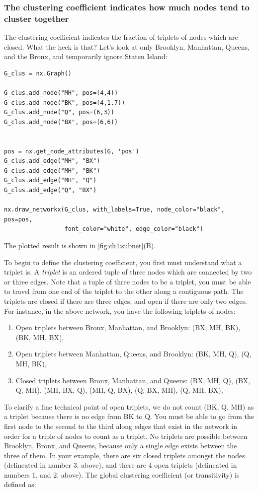 \subsubsection{The clustering coefficient indicates how much nodes tend to cluster together}
\label{sec:ch4:prop-net:clustering}

The clustering coefficient indicates the fraction of triplets of nodes which are closed. What the heck is that? Let's look at only Brooklyn, Manhattan, Queens, and the Bronx, and temporarily ignore Staten Island:

\begin{lstlisting}[style=python]
G_clus = nx.Graph()

G_clus.add_node("MH", pos=(4,4))
G_clus.add_node("BK", pos=(4,1.7))
G_clus.add_node("Q", pos=(6,3))
G_clus.add_node("BX", pos=(6,6))


pos = nx.get_node_attributes(G, 'pos')
G_clus.add_edge("MH", "BX")
G_clus.add_edge("MH", "BK")
G_clus.add_edge("MH", "Q")
G_clus.add_edge("Q", "BX")

nx.draw_networkx(G_clus, with_labels=True, node_color="black", pos=pos,
                 font_color="white", edge_color="black")
\end{lstlisting}
The plotted result is shown in \ref{fig:ch4:subnet}(B).

To begin to define the clustering coefficient, you first must understand what a {triplet} is. A \textit{triplet} is an ordered tuple of three nodes which are connected by two or three edges. Note that a tuple of three nodes to be a triplet, you must be able to travel from one end of the triplet to the other along a contiguous path. The triplets are {closed} if there are three edges, and {open} if there are only two edges. For instance, in the above network, you have the following triplets of nodes:
\begin{enumerate}
    \item Open triplets between Bronx, Manhattan, and Brooklyn: (BX, MH, BK), (BK, MH, BX),
    \item Open triplets between Manhattan, Queens, and Brooklyn: (BK, MH, Q), (Q, MH, BK),
    \item Closed triplets between Bronx, Manhattan, and Queens: (BX, MH, Q), (BX, Q, MH), (MH, BX, Q), (MH, Q, BX), (Q, BX, MH), (Q, MH, BX),
\end{enumerate}

To clarify a fine technical point of open triplets, we do not count (BK, Q, MH) as a triplet because there is no edge from BK to Q. You must be able to go from the first node to the second to the third along edges that exist in the network in order for a triple of nodes to count as a triplet. No triplets are possible between Brooklyn, Bronx, and Queens, because only a single edge exists between the three of them. In your example, there are six closed triplets amongst the nodes (delineated in number 3. above), and there are 4 open triplets (delineated in numbers 1. and 2. above). The global clustering coefficient (or transitivity) is defined as:

